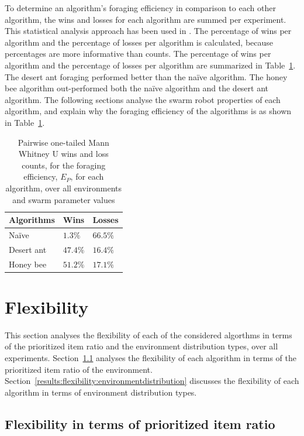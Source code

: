 To determine an algorithm's foraging efficiency in comparison to each other algorithm, the wins and losses for each algorithm are summed per experiment. This statistical analysis approach has been used in \cite{helbig2013performance}. The percentage of wins per algorithm and the percentage of losses per algorithm is calculated, because percentages are more informative than counts. The percentage of wins per algorithm and the percentage of losses per algorithm are summarized in Table~\ref{summarytable}. The desert ant foraging performed better than the na\"ive algorithm. The honey bee algorithm out-performed both the na\"ive algorithm and the desert ant algorithm. The following sections analyse the swarm robot properties of each algorithm, and explain why the foraging efficiency of the algorithms is as shown in Table~\ref{summarytable}.


\begin{table}[!htbp]
    \centering
    \caption{Pairwise one-tailed Mann Whitney U wins and loss counts, for the foraging efficiency, $E_P$, for each algorithm, over all environments and swarm parameter values }
    \label{summarytable}
    \begin{tabular}{@{}lll@{}}
    \toprule
    \textbf{Algorithms} & \textbf{Wins} & \textbf{Losses} \\ \midrule
    Na\"ive               & $1.3\%$          & $66.5\%$           \\
    Desert ant          & $47.4\%$         & $16.4\%$           \\
    Honey bee           & $51.2\%$         & $17.1\%$          \\ \bottomrule
    \end{tabular}
\end{table}


\section{Flexibility}
\label{results:flexibility}

This section analyses the flexibility of each of the considered algorthms in terms of the prioritized item ratio and the environment distribution types, over all experiments. Section~\ref{results:prioritizeditemratio} analyses the flexibility of each algorithm in terms of the prioritized item ratio of the environment. Section~\ref{results:flexibility:environmentdistribution} discusses the flexibility of each algorithm in terms of environment distribution types.
\subsection{Flexibility in terms of prioritized item ratio}
\label{results:prioritizeditemratio}

